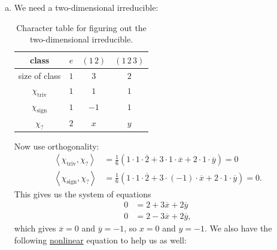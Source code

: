 \documentclass[12pt]{article}
\newcommand{\vbrack}[1]{\left \langle #1 \right \rangle}
\theoremstyle{definition}
\begin{document}
\begin{enumerate}[start=0]
\begin{enumerate}[(a)]
\begin{table}[H]
            \caption{Character table for $V$, $W$, and $U$.}
            \label{tab:Table4}
        \end{table}
        \item We need a two-dimensional irreducible:
        \begin{table}[H]
            \centering
            \begin{tabular}{|| c || c | c | c ||}
                \hline
                class & $e$ & $(1\,2)$ & $(1\,2\,3)$ \\
                \hline
                size of class & $1$ & $3$ & $2$ \\
                \hline
                $\chi_{\text{triv}}$ & $1$ & $1$ & $1$ \\
                $\chi_{\text{sign}}$ & $1$ & $-1$ & $1$ \\
                \hline
                $\chi_{?}$ & $2$ & $x$ & $y$ \\
                \hline
            \end{tabular}
            \caption{Character table for figuring out the two-dimensional irreducible.}
            \label{tab:Table5}
        \end{table}
        Now use orthogonality:
        \begin{equation}
            \begin{split}
                \vbrack{ \chi_{\text{triv}} , \chi_{?}} & = \frac{1}{6} \left( 1 \cdot 1 \cdot \overline{2} + 3 \cdot 1 \cdot \overline{x} + 2 \cdot 1 \cdot \overline{y} \right) = 0 \\
                \vbrack{ \chi_{\text{sign}} , \chi_{?}} & = \frac{1}{6} \left( 1 \cdot 1 \cdot \overline{2} + 3 \cdot (-1) \cdot \overline{x} + 2 \cdot 1 \cdot \overline{y} \right) = 0.
            \end{split}
        \end{equation}
        This gives us the system of equations
        \begin{equation}
            \begin{split}
                0 & = 2 + 3 \overline{x} + 2 \overline{y} \\
                0 & = 2 - 3 \overline{x} + 2 \overline{y},
            \end{split}
        \end{equation}
        which gives $\overline{x} = 0$ and $\overline{y} = -1$, so $x = 0$ and $y = -1$. We also have the following \underline{nonlinear} equation to help us as well:
        \begin{equation}

\end{equation}
\end{enumerate}
\end{enumerate}
\end{document}
